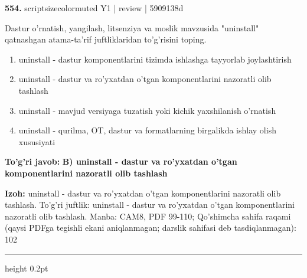 \documentclass[10pt,a4paper]{article}
\begin{document}
{\bfseries\sffamily\color{ink} 554.} {scriptsizecolor{muted} Y1 | review | 5909138d}
\par
Dastur o'rnatish, yangilash, litsenziya va moslik mavzusida "uninstall" qatnashgan atama-ta'rif juftliklaridan to'g'risini toping.
\begin{enumerate}[label=\Alph*),leftmargin=9mm]
\item uninstall - dastur komponentlarini tizimda ishlashga tayyorlab joylashtirish
\item uninstall - dastur va ro'yxatdan o'tgan komponentlarini nazoratli olib tashlash
\item uninstall - mavjud versiyaga tuzatish yoki kichik yaxshilanish o'rnatish
\item uninstall - qurilma, OT, dastur va formatlarning birgalikda ishlay olish xususiyati
\end{enumerate}
\begin{tcolorbox}[enhanced,breakable,colback=teal!4,colframe=teal!60!black,boxrule=0.45pt,arc=1.2mm,left=2.7mm,right=2.7mm,top=1.8mm,bottom=1.8mm,before skip=2mm,after skip=2mm]
{\bfseries\sffamily\color{teal}To'g'ri javob:} \textbf{B) uninstall - dastur va ro'yxatdan o'tgan komponentlarini nazoratli olib tashlash}
\par\smallskip
{\bfseries Izoh:} uninstall - dastur va ro'yxatdan o'tgan komponentlarini nazoratli olib tashlash. To'g'ri juftlik: uninstall - dastur va ro'yxatdan o'tgan komponentlarini nazoratli olib tashlash. Manba: CAM8, PDF 99-110; Qo'shimcha sahifa raqami (qaysi PDFga tegishli ekani aniqlanmagan; darslik sahifasi deb tasdiqlanmagan): 102
\end{tcolorbox}
\vspace{2mm}\hrule height 0.2pt\vspace{3mm}
\end{document}
